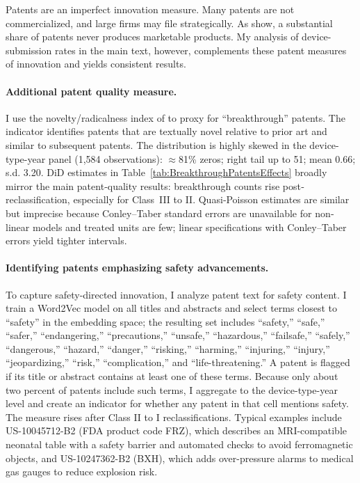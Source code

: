 \documentclass[letterpaper,12pt]{article}
\theoremstyle{definition}
\begin{document}
Patents are an imperfect innovation measure. Many patents are not commercialized, and large firms may file strategically. As \citet{argente2020patents} show, a substantial share of patents never produces marketable products. My analysis of device-submission rates in the main text, however, complements these patent measures of innovation and yields consistent results. 

\paragraph{Additional patent quality measure.}\label{appendix:breakthrough}

I use the novelty/radicalness index of \citet{KellySeru:2021} to proxy for “breakthrough” patents. The indicator identifies patents that are textually novel relative to prior art and similar to subsequent patents. The distribution is highly skewed in the device-type-year panel (1{,}584 observations): $\approx$81\% zeros; right tail up to 51; mean 0.66; s.d. 3.20. DiD estimates in Table~\ref{tab:BreakthroughPatentsEffects} broadly mirror the main patent‐quality results: breakthrough counts rise post‐reclassification, especially for Class~III to II. Quasi‐Poisson estimates are similar but imprecise because Conley–Taber standard errors are unavailable for non‐linear models and treated units are few; linear specifications with Conley–Taber errors yield tighter intervals.



\paragraph{Identifying patents emphasizing safety advancements.}\label{appendix:safety}

To capture safety-directed innovation, I analyze patent text for safety content. I train a Word2Vec model on all titles and abstracts and select terms closest to “safety” in the embedding space; the resulting set includes “safety,” “safe,” “safer,” “endangering,” “precautions,” “unsafe,” “hazardous,” “failsafe,” “safely,” “dangerous,” “hazard,” “danger,” “risking,” “harming,” “injuring,” “injury,” “jeopardizing,” “risk,” “complication,” and “life-threatening.” A patent is flagged if its title or abstract contains at least one of these terms. Because only about two percent of patents include such terms, I aggregate to the device-type-year level and create an indicator for whether any patent in that cell mentions safety. The measure rises after Class II to I reclassifications. Typical examples include US-10045712-B2 (FDA product code FRZ), which describes an MRI-compatible neonatal table with a safety barrier and automated checks to avoid ferromagnetic objects, and US-10247362-B2 (BXH), which adds over-pressure alarms to medical gas gauges to reduce explosion risk.
\end{document}
